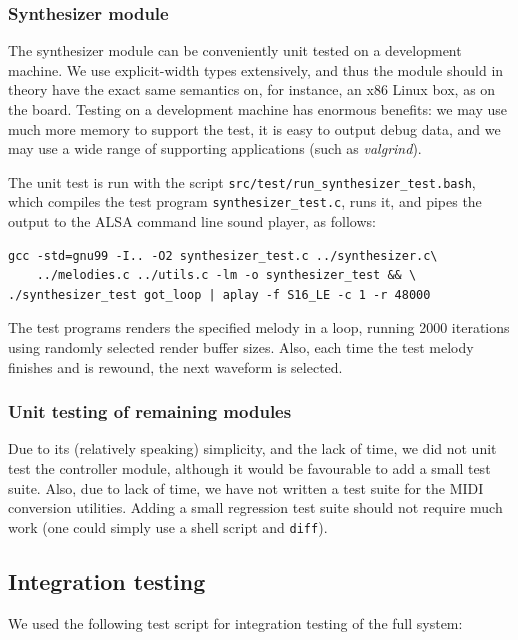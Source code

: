 \documentclass[a4paper,9pt]{article}
\begin{document}
\subsubsection{Synthesizer module}
\label{sec:synthtest}
The synthesizer module can be conveniently unit tested on a development
machine. We use explicit-width types extensively, and thus the module should
in theory have the exact same semantics on, for instance, an x86 Linux box, as
on the board. Testing on a development machine has enormous benefits: we may
use much more memory to support the test, it is easy to output debug data, and
we may use a wide range of supporting applications (such as \emph{valgrind}).

The unit test is run with the script
\texttt{src/test/run\_synthesizer\_test.bash}, which compiles the test program
\texttt{synthesizer\_test.c}, runs it, and pipes the output to the ALSA
command line sound player, as follows:
\begin{verbatim}
gcc -std=gnu99 -I.. -O2 synthesizer_test.c ../synthesizer.c\
    ../melodies.c ../utils.c -lm -o synthesizer_test && \
./synthesizer_test got_loop | aplay -f S16_LE -c 1 -r 48000
\end{verbatim}
The test programs renders the specified melody in a loop, running 2000
iterations using randomly selected render buffer sizes.  Also, each time the
test melody finishes and is rewound, the next waveform is selected.

\subsubsection{Unit testing of remaining modules}
Due to its (relatively speaking) simplicity, and the lack of time, we did not
unit test the controller module, although it would be favourable to add a
small test suite.
Also, due to lack of time, we have not written a test suite for the MIDI
conversion utilities. Adding a small regression test suite should not require
much work (one could simply use a shell script and \texttt{diff}).

\subsection{Integration testing}
We used the following test script for integration testing of the full system:
\end{document}
